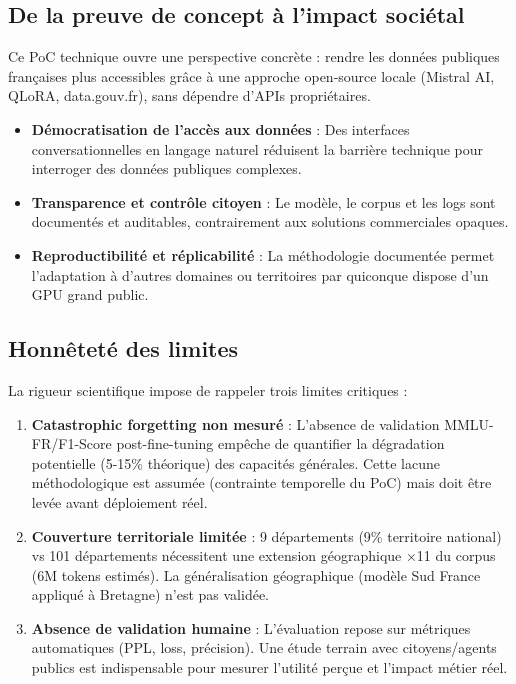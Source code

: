 \subsection{De la preuve de concept à l'impact sociétal}

Ce PoC technique ouvre une perspective concrète : rendre les données publiques françaises plus accessibles grâce à une approche open-source locale (Mistral AI, QLoRA, data.gouv.fr), sans dépendre d'APIs propriétaires.

\begin{itemize}
    \item \textbf{Démocratisation de l'accès aux données} : Des interfaces conversationnelles en langage naturel réduisent la barrière technique pour interroger des données publiques complexes.
    \item \textbf{Transparence et contrôle citoyen} : Le modèle, le corpus et les logs sont documentés et auditables, contrairement aux solutions commerciales opaques.
    \item \textbf{Reproductibilité et réplicabilité} : La méthodologie documentée permet l'adaptation à d'autres domaines ou territoires par quiconque dispose d'un GPU grand public.
\end{itemize}

\subsection{Honnêteté des limites}

La rigueur scientifique impose de rappeler trois limites critiques :

\begin{enumerate}
    \item \textbf{Catastrophic forgetting non mesuré} : L'absence de validation MMLU-FR/F1-Score post-fine-tuning empêche de quantifier la dégradation potentielle (5-15\% théorique) des capacités générales. Cette lacune méthodologique est assumée (contrainte temporelle du PoC) mais doit être levée avant déploiement réel.
    
    \item \textbf{Couverture territoriale limitée} : 9 départements (9\% territoire national) vs 101 départements nécessitent une extension géographique ×11 du corpus (6M tokens estimés). La généralisation géographique (modèle Sud France appliqué à Bretagne) n'est pas validée.
    
    \item \textbf{Absence de validation humaine} : L'évaluation repose sur métriques automatiques (PPL, loss, précision). Une étude terrain avec citoyens/agents publics est indispensable pour mesurer l'utilité perçue et l'impact métier réel.
\end{enumerate}

